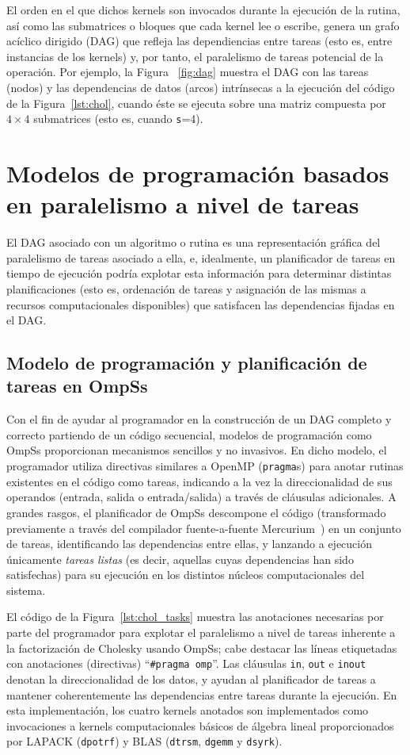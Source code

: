 El orden en el que dichos kernels son invocados durante la ejecución de la rutina, 
así como las submatrices o bloques que cada kernel lee o escribe, genera un grafo acíclico dirigido (DAG)
que refleja las dependiencias entre tareas (esto es, entre instancias de los kernels) y, por tanto,
el paralelismo de tareas potencial de la operación.
Por ejemplo, la Figura ~\ref{fig:dag} muestra el DAG con las tareas (nodos) y las dependencias de datos
(arcos) intrínsecas a la ejecución del código de la Figura~\ref{lst:chol}, cuando éste se ejecuta sobre
una matriz compuesta por $4 \times 4$ submatrices (esto es, cuando {\tt s}=4).  

\section{Modelos de programación basados en paralelismo a nivel de tareas}

El DAG asociado con un algoritmo o rutina es una representación gráfica del paralelismo de tareas asociado a ella,
e, idealmente, un planificador de tareas en tiempo de ejecución podría explotar esta información para determinar
distintas planificaciones (esto es, ordenación de tareas y asignación de las mismas a recursos computacionales
disponibles) que satisfacen las dependencias fijadas en el DAG.

\subsection{Modelo de programación y planificación de tareas en OmpSs}

Con el fin de ayudar al programador en la construcción de un DAG completo y correcto partiendo de un código secuencial,
modelos de programación como OmpSs proporcionan mecanismos sencillos y no invasivos. En dicho modelo, el programador 
utiliza directivas similares a OpenMP ({\tt pragma}s) para anotar rutinas existentes en el código como tareas, indicando
a la vez la direccionalidad de sus operandos (entrada, salida o entrada/salida) a través de cláusulas adicionales. A 
grandes rasgos, el planificador de OmpSs descompone el código (transformado previamente a través del compilador 
fuente-a-fuente Mercurium~\cite{Mercurium}) en un conjunto de tareas, identificando las dependencias entre ellas, 
y lanzando a ejecución únicamente {\em tareas listas} (es decir, aquellas cuyas dependencias han sido satisfechas)
para su ejecución en los distintos núcleos computacionales del sistema.


El código de la Figura~\ref{lst:chol_tasks} muestra las anotaciones necesarias por parte del programador para explotar
el paralelismo a nivel de tareas inherente a la factorización de Cholesky usando OmpSs; cabe destacar las líneas etiquetadas
con  anotaciones (directivas) ``{\tt \#pragma omp}''.
Las cláusulas {\tt in}, {\tt out} e {\tt inout} denotan la direccionalidad de los datos, y ayudan al planificador
de tareas a mantener coherentemente las dependencias entre tareas durante la ejecución. 
En esta implementación, los cuatro kernels anotados son implementados como invocaciones a 
kernels computacionales básicos de álgebra lineal proporcionados por LAPACK
({\tt dpotrf}) y BLAS ({\tt dtrsm}, {\tt dgemm} y {\tt dsyrk}).

